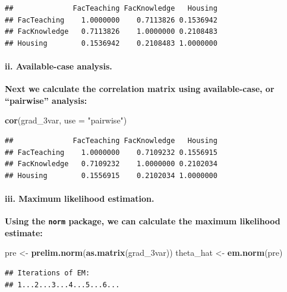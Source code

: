 \documentclass[
]{article}
\newenvironment{Shaded}{\begin{snugshade}}{\end{snugshade}}
\newcommand{\DataTypeTok}[1]{\textcolor[rgb]{0.13,0.29,0.53}{#1}}
\newcommand{\KeywordTok}[1]{\textcolor[rgb]{0.13,0.29,0.53}{\textbf{#1}}}
\newcommand{\NormalTok}[1]{#1}
\newcommand{\StringTok}[1]{\textcolor[rgb]{0.31,0.60,0.02}{#1}}
\begin{document}
\begin{verbatim}
##              FacTeaching FacKnowledge   Housing
## FacTeaching    1.0000000    0.7113826 0.1536942
## FacKnowledge   0.7113826    1.0000000 0.2108483
## Housing        0.1536942    0.2108483 1.0000000
\end{verbatim}

\hypertarget{ii.-available-case-analysis.}{%
\paragraph{ii. Available-case
analysis.}\label{ii.-available-case-analysis.}}

\textbf{Next we calculate the correlation matrix using available-case,
or ``pairwise'' analysis:}

\begin{Shaded}
\begin{Highlighting}[]
\KeywordTok{cor}\NormalTok{(grad_3var, }\DataTypeTok{use =} \StringTok{"pairwise"}\NormalTok{)}
\end{Highlighting}
\end{Shaded}

\begin{verbatim}
##              FacTeaching FacKnowledge   Housing
## FacTeaching    1.0000000    0.7109232 0.1556915
## FacKnowledge   0.7109232    1.0000000 0.2102034
## Housing        0.1556915    0.2102034 1.0000000
\end{verbatim}

\hypertarget{iii.-maximum-likelihood-estimation.}{%
\paragraph{iii. Maximum likelihood
estimation.}\label{iii.-maximum-likelihood-estimation.}}

\textbf{Using the \texttt{norm} package, we can calculate the maximum
likelihood estimate:}

\begin{Shaded}
\begin{Highlighting}[]
\NormalTok{pre <-}\StringTok{ }\KeywordTok{prelim.norm}\NormalTok{(}\KeywordTok{as.matrix}\NormalTok{(grad_3var))}
\NormalTok{theta_hat <-}\StringTok{ }\KeywordTok{em.norm}\NormalTok{(pre)}
\end{Highlighting}
\end{Shaded}

\begin{verbatim}
## Iterations of EM: 
## 1...2...3...4...5...6...
\end{verbatim}
\end{document}
